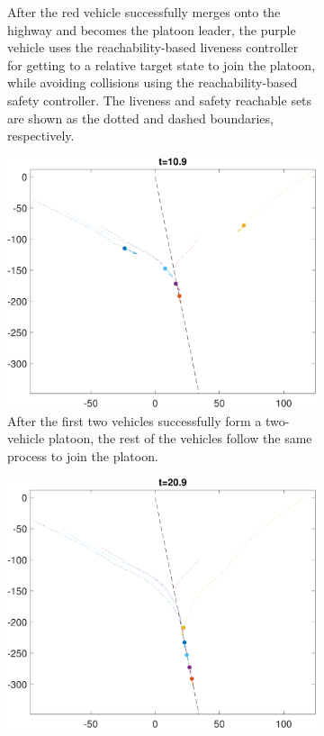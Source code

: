 \begin{figure}
\begin{subfigure}[t]{0.45\textwidth}
        \caption{After the red vehicle successfully merges onto the highway and becomes the platoon leader, the purple vehicle uses the reachability-based liveness controller for getting to a relative target state to join the platoon, while avoiding collisions using the reachability-based safety controller. The liveness and safety reachable sets are shown as the dotted and dashed boundaries, respectively.}
    \end{subfigure}

    \begin{subfigure}[t]{0.45\textwidth} \label{subfig:fp_110}
        \includegraphics[width=\textwidth]{fig/fp_110}
        \caption{After the first two vehicles successfully form a two-vehicle platoon, the rest of the vehicles follow the same process to join the platoon.}
    \end{subfigure}
    \begin{subfigure}[t]{0.45\textwidth} \label{subfig:fp_210}
        \includegraphics[width=\textwidth]{fig/fp_210}

\end{subfigure}
\end{figure}
